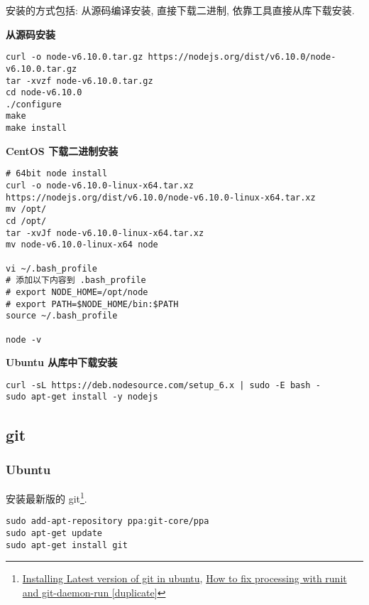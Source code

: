 安装的方式包括: 从源码编译安装, 直接下载二进制,
依靠工具直接从库下载安装.

\textbf{从源码安装}

\begin{lstlisting}
curl -o node-v6.10.0.tar.gz https://nodejs.org/dist/v6.10.0/node-v6.10.0.tar.gz
tar -xvzf node-v6.10.0.tar.gz
cd node-v6.10.0
./configure
make
make install
\end{lstlisting}

\textbf{CentOS 下载二进制安装}

\begin{lstlisting}
# 64bit node install
curl -o node-v6.10.0-linux-x64.tar.xz https://nodejs.org/dist/v6.10.0/node-v6.10.0-linux-x64.tar.xz
mv /opt/
cd /opt/
tar -xvJf node-v6.10.0-linux-x64.tar.xz
mv node-v6.10.0-linux-x64 node

vi ~/.bash_profile
# 添加以下内容到 .bash_profile
# export NODE_HOME=/opt/node
# export PATH=$NODE_HOME/bin:$PATH
source ~/.bash_profile

node -v
\end{lstlisting}

\textbf{Ubuntu 从库中下载安装}

\begin{lstlisting}
curl -sL https://deb.nodesource.com/setup_6.x | sudo -E bash -
sudo apt-get install -y nodejs
\end{lstlisting}

\subsection{git}\label{git}

\subsubsection{Ubuntu}\label{ubuntu}

安装最新版的 git\footnote{\href{http://stackoverflow.com/questions/19109542/installing-latest-version-of-git-in-ubuntu/19109661\#19109661}{Installing
  Latest version of git in ubuntu},
  \href{http://askubuntu.com/questions/765565/how-to-fix-processing-with-runit-and-git-daemon-run/772095\#772095}{How
  to fix processing with runit and git-daemon-run {[}duplicate{]}}}.

\begin{lstlisting}
sudo add-apt-repository ppa:git-core/ppa
sudo apt-get update
sudo apt-get install git
\end{lstlisting}


